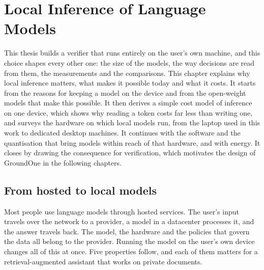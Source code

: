 \chapter{Local Inference of Language Models}
\label{sec:local}


This thesis builds a verifier that runs entirely on the user's own machine, and this choice shapes every other one: the
size of the models, the way decisions are read from them, the measurements and the comparisons. This chapter explains
why local inference matters, what makes it possible today and what it costs. It starts from the reasons for keeping a
model on the device and from the open-weight models that make this possible. It then derives a simple cost model of
inference on one device, which shows why reading a token costs far less than writing one, and surveys the hardware on which
local models run, from the laptop used in this work to dedicated desktop machines. It continues with the software and
the quantisation that bring models within reach of that hardware, and with energy. It closes by drawing the consequence
for verification, which motivates the design of GroundOne in the following chapters.

\section{From hosted to local models}
\label{sec:local-why}

Most people use language models through hosted services. The user's input travels over the network to a provider, a
model in a datacenter processes it, and the answer travels back. The model, the hardware and the policies that govern
the data all belong to the provider. Running the model on the user's own device changes all of this at once. Five
properties follow, and each of them matters for a retrieval-augmented assistant that works on private documents.

